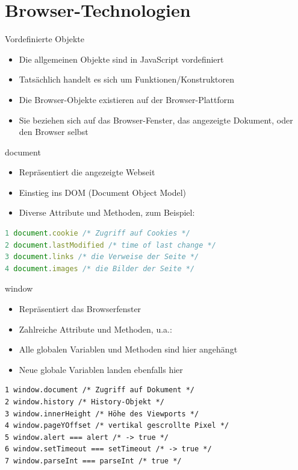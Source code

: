 \section{Browser-Technologien}
\begin{definition}{Vordefinierte Objekte}
\begin{itemize}
  \item Die allgemeinen Objekte sind in JavaScript vordefiniert
  \item Tatsächlich handelt es sich um Funktionen/Konstruktoren
  \item Die Browser-Objekte existieren auf der Browser-Plattform
  \item Sie beziehen sich auf das Browser-Fenster, das angezeigte Dokument, oder den Browser selbst
\end{itemize}
\end{definition}

\begin{definition}{document}
\begin{itemize}
  \item Repräsentiert die angezeigte Webseit
  \item Einstieg ins DOM (Document Object Model)
  \item Diverse Attribute und Methoden, zum Beispiel:
\end{itemize}
\end{definition}

\begin{lstlisting}[language=JavaScript, style=base]
1 document.cookie /* Zugriff auf Cookies */
2 document.lastModified /* time of last change */
3 document.links /* die Verweise der Seite */
4 document.images /* die Bilder der Seite */
\end{lstlisting}

window

\begin{itemize}
  \item Repräsentiert das Browserfenster
  \item Zahlreiche Attribute und Methoden, u.a.:
  \item Alle globalen Variablen und Methoden sind hier angehängt
  \item Neue globale Variablen landen ebenfalls hier
\end{itemize}

\begin{verbatim}
1 window.document /* Zugriff auf Dokument */
2 window.history /* History-Objekt */
3 window.innerHeight /* Höhe des Viewports */
4 window.pageYOffset /* vertikal gescrollte Pixel */
5 window.alert === alert /* -> true */
6 window.setTimeout === setTimeout /* -> true */
7 window.parseInt === parseInt /* true */
\end{verbatim}

